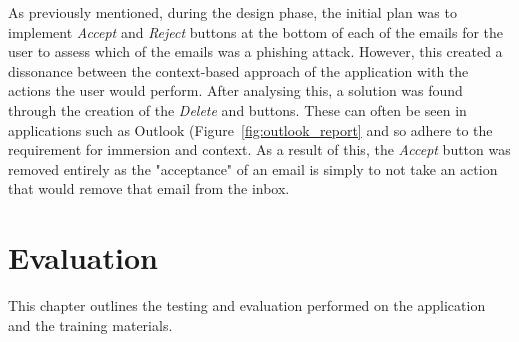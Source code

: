 \documentclass{l4proj}
\begin{document}
As previously mentioned, during the design phase, the initial plan was to implement \textit{Accept} and \textit{Reject} buttons at the bottom of each of the emails for the user to assess which of the emails was a phishing attack. However, this created a dissonance between the context-based approach of the application with the actions the user would perform. After analysing this, a solution was found through the creation of the \textit{Delete} and  buttons. These can often be seen in applications such as Outlook (Figure~\ref{fig:outlook_report} and so adhere to the requirement for immersion and context. As a result of this, the \textit{Accept} button was removed entirely as the "acceptance" of an email is simply to not take an action that would remove that email from the inbox.





\chapter{Evaluation} 

This chapter outlines the testing and evaluation performed on the application and the training materials.
\end{document}
